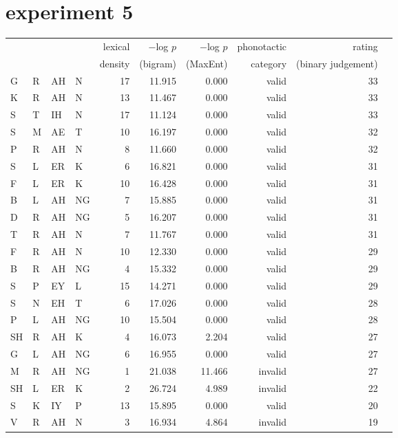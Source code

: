 \section{\citet{Scholes1966} experiment 5}    

\begin{longtable}{l@{ } l@{ } l@{ } l r r r r r r} 
\toprule
  &   &    &     & lexical & $-$log $p$ & $-$log $p$ & phonotactic & rating \\
&&&& density & (bigram) & (MaxEnt) & category & (binary judgement) \\
\midrule 
G  & R  & AH & N  & 17 & 11.915 & 0.000  & valid   & 33 \\
K  & R  & AH & N  & 13 & 11.467 & 0.000  & valid   & 33 \\
S  & T  & IH & N  & 17 & 11.124 & 0.000  & valid   & 33 \\
S  & M  & AE & T  & 10 & 16.197 & 0.000  & valid   & 32 \\
P  & R  & AH & N  & 8  & 11.660 & 0.000  & valid   & 32 \\
S  & L  & ER & K  & 6  & 16.821 & 0.000  & valid   & 31 \\
F  & L  & ER & K  & 10 & 16.428 & 0.000  & valid   & 31 \\
B  & L  & AH & NG & 7  & 15.885 & 0.000  & valid   & 31 \\
D  & R  & AH & NG & 5  & 16.207 & 0.000  & valid   & 31 \\
T  & R  & AH & N  & 7  & 11.767 & 0.000  & valid   & 31 \\
F  & R  & AH & N  & 10 & 12.330 & 0.000  & valid   & 29 \\
B  & R  & AH & NG & 4  & 15.332 & 0.000  & valid   & 29 \\
S  & P  & EY & L  & 15 & 14.271 & 0.000  & valid   & 29 \\
S  & N  & EH & T  & 6  & 17.026 & 0.000  & valid   & 28 \\
P  & L  & AH & NG & 10 & 15.504 & 0.000  & valid   & 28 \\
SH & R  & AH & K  & 4  & 16.073 & 2.204  & valid   & 27 \\
G  & L  & AH & NG & 6  & 16.955 & 0.000  & valid   & 27 \\
M  & R  & AH & NG & 1  & 21.038 & 11.466 & invalid & 27 \\
SH & L  & ER & K  & 2  & 26.724 & 4.989  & invalid & 22 \\
S  & K  & IY & P  & 13 & 15.895 & 0.000  & valid   & 20 \\
V  & R  & AH & N  & 3  & 16.934 & 4.864  & invalid & 19 \\

\end{longtable}
